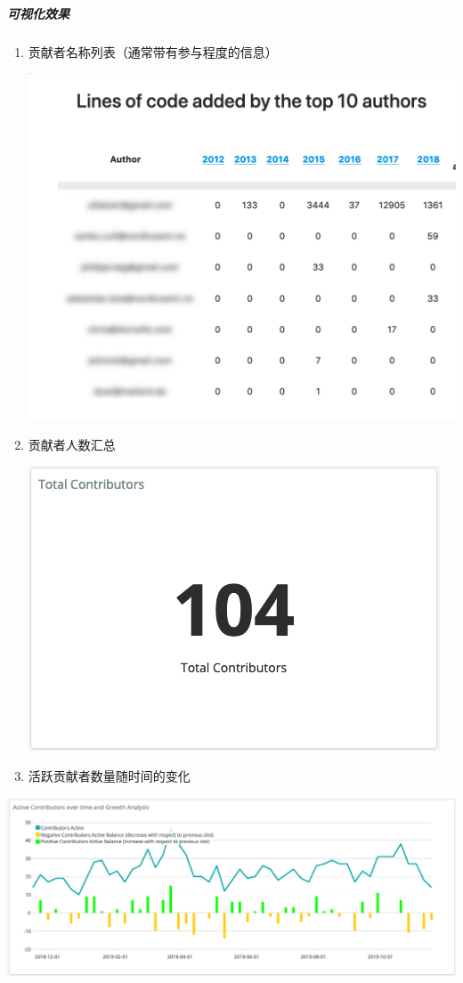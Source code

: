 \hypertarget{ux53efux89c6ux5316ux6548ux679c}{%
\subparagraph{可视化效果}\label{ux53efux89c6ux5316ux6548ux679c}}

\begin{enumerate}
\def\labelenumi{\arabic{enumi}.}
\item
  贡献者名称列表（通常带有参与程度的信息）

  \includegraphics{images/contributors_top-contributor-info.png}
\item
  贡献者人数汇总

  \includegraphics{images/contributors_summary-contributor-number.png}
\item
  活跃贡献者数量随时间的变化
\end{enumerate}

\includegraphics{images/contributors_growth.png}

